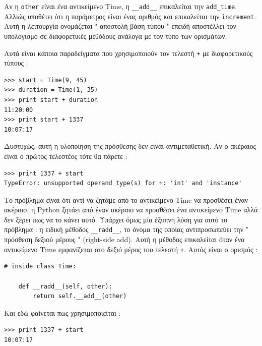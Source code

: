 \documentclass[10pt]{book}
\begin{document}
Αν η  {\tt other}  είναι ένα αντικείμενο  Time,  η  \verb"__add__"  επικαλείται την  \verb"add_time".   Αλλιώς υποθέτει ότι η παράμετρος είναι ένας αριθμός και επικαλείται την  {\tt increment}.   Αυτή η λειτουργία ονομάζεται  " αποστολή βάση τύπου "  επειδή αποστέλλει τον υπολογισμό σε διαφορετικές 
μεθόδους ανάλογα με τον τύπο των ορισμάτων.

Αυτά είναι κάποια παραδείγματα που χρησιμοποιούν τον τελεστή  {\tt +}  με διαφορετικούς τύπους :

\begin{verbatim}
>>> start = Time(9, 45)
>>> duration = Time(1, 35)
>>> print start + duration
11:20:00
>>> print start + 1337
10:07:17
\end{verbatim}
%
 Δυστυχώς, αυτή η υλοποίηση της πρόσθεσης δεν είναι αντιμεταθετική. 
Αν ο ακέραιος είναι ο πρώτος τελεστέος τότε θα πάρετε :

\begin{verbatim}
>>> print 1337 + start
TypeError: unsupported operand type(s) for +: 'int' and 'instance'
\end{verbatim}
%
 Το πρόβλημα είναι ότι αντί να ζητάμε από το αντικείμενο  Time  να προσθέσει 
έναν ακέραιο, η  Python  ζητάει από έναν ακέραιο να προσθέσει ένα αντικείμενο  
Time  αλλά δεν ξέρει πως να το κάνει αυτό.  Υπάρχει όμως μία έξυπνη λύση για αυτό το πρόβλημα :  η ειδική μέθοδος  \verb"__radd__",  το όνομα της οποίας αντιπροσωπεύει την  " πρόσθεση δεξιού μέρους " (right-side add).   Αυτή η 
μέθοδος επικαλείται όταν ένα αντικείμενο  Time  εμφανίζεται στο δεξιό μέρος του τελεστή  {\tt +}.   Αυτός είναι ο ορισμός :

\begin{verbatim}
# inside class Time:

    def __radd__(self, other):
        return self.__add__(other)
\end{verbatim}
%
 Και εδώ φαίνεται πως χρησιμοποιείται :

\begin{verbatim}
>>> print 1337 + start
10:07:17
\end{verbatim}
%
\end{document}
